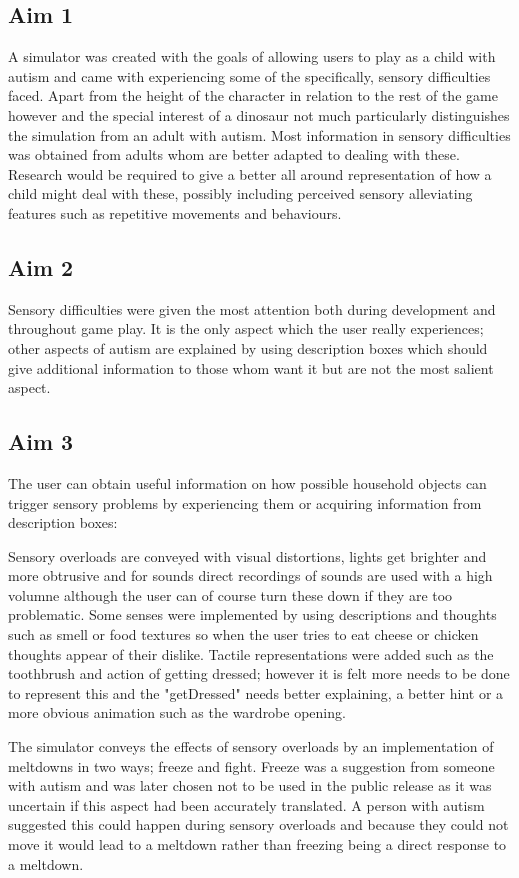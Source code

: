 \subsection*{Aim 1}
A simulator was created with the goals of allowing users to play as a child with autism and came with experiencing some of the specifically, sensory difficulties faced. Apart from the height of the character in relation to the rest of the game however and the special interest of a dinosaur not much particularly distinguishes the simulation from an adult with autism. Most information in sensory difficulties was obtained from adults whom are better adapted to dealing with these. Research would be required to give a better all around representation of how a child might deal with these, possibly including perceived sensory alleviating features such as repetitive movements and behaviours.  

\subsection*{Aim 2}
Sensory difficulties were given the most attention both during development and throughout game play. It is the only aspect which the user really experiences; other aspects of autism are explained by using description boxes which should give additional information to those whom want it but are not the most salient aspect. 

\subsection*{Aim 3}
The user can obtain useful information on how possible household objects can trigger sensory problems by experiencing them or acquiring information from description boxes:

Sensory overloads are conveyed with visual distortions, lights get brighter and more obtrusive and for sounds direct recordings of sounds are used with a high volumne although the user can of course turn these down if they are too problematic. Some senses were implemented by using descriptions and thoughts such as smell or food textures so when the user tries to eat cheese or chicken thoughts appear of their dislike. Tactile representations were added such as the toothbrush and action of getting dressed; however it is felt more needs to be done to represent this and the "getDressed" needs better explaining, a better hint or a more obvious animation such as the wardrobe opening.

The simulator conveys the effects of sensory overloads by an implementation of meltdowns in two ways; freeze and fight. Freeze was a suggestion from someone with autism and was later chosen not to be used in the public release as it was uncertain if this aspect had been accurately translated. A person with autism suggested this could happen during sensory overloads and because they could not move it would lead to a meltdown rather than freezing being a direct response to a meltdown. 

